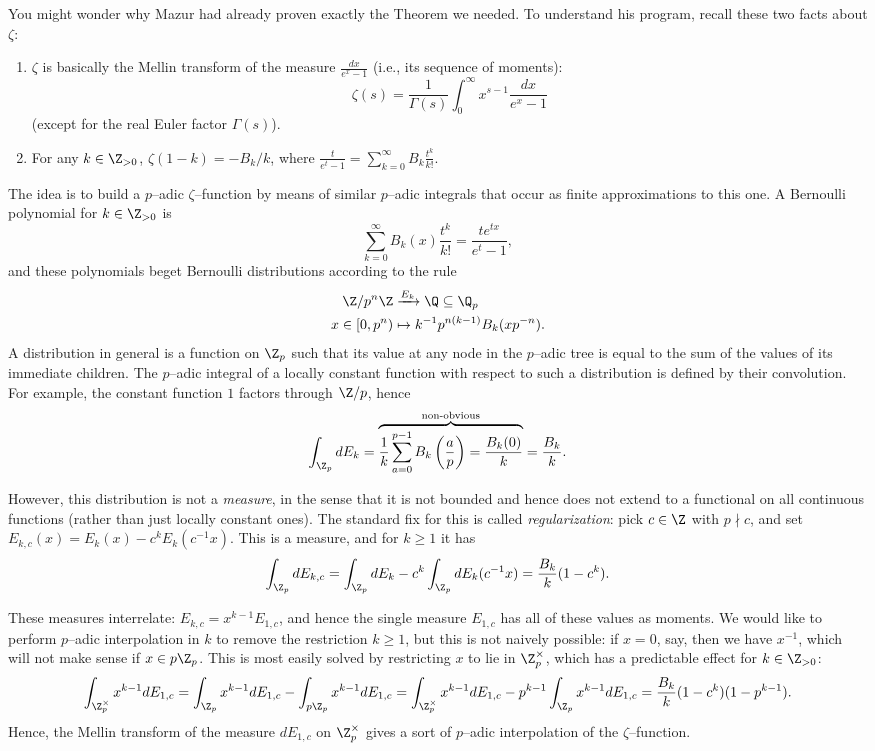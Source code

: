 You might wonder why Mazur had already proven exactly the Theorem we needed.  To understand his program, recall these two facts about $\zeta$:
\begin{enumerate}
    \item $\zeta$ is basically the Mellin transform of the measure $\frac{dx}{e^x - 1}$ (i.e., its sequence of moments): \[\zeta(s) = \frac{1}{\Gamma(s)} \int_0^\infty x^{s-1} \frac{dx}{e^x - 1}\] (except for the real Euler factor $\Gamma(s)$).
    \item For any $k \in \Z_{> 0}$, $\zeta(1 - k) = -B_k / k$, where $\frac{t}{e^t - 1} = \sum_{k=0}^\infty B_k \frac{t^k}{k!}$.
\end{enumerate}
The idea is to build a $p$--adic $\zeta$--function by means of similar $p$--adic integrals that occur as finite approximations to this one.  A Bernoulli polynomial for $k \in \Z_{>0}$ is \[\sum_{k=0}^\infty B_k(x) \frac{t^k}{k!} = \frac{t e^{tx}}{e^t - 1},\] and these polynomials beget Bernoulli distributions according to the rule
\begin{align*}
\Z/p^n\Z & \xrightarrow{E_k} \Q \subseteq \Q_p \\
x \in [0, p^n) & \mapsto k^{-1} p^{n(k-1)} B_k(x p^{-n}).
\end{align*}
A distribution in general is a function on $\Z_p$ such that its value at any node in the $p$--adic tree is equal to the sum of the values of its immediate children.  The $p$--adic integral of a locally constant function with respect to such a distribution is defined by their convolution.  For example, the constant function $1$ factors through $\Z/p$, hence \[\int_{\Z_p} dE_k = \overset{\text{non-obvious}}{\overbrace{\frac{1}{k} \sum_{a=0}^{p-1} B_k\left(\frac{a}{p}\right) = \frac{B_k(0)}{k}}} = \frac{B_k}{k}.\]

However, this distribution is not a \emph{measure}, in the sense that it is not bounded and hence does not extend to a functional on all continuous functions (rather than just locally constant ones).  The standard fix for this is called \emph{regularization}: pick $c \in \Z$ with $p \nmid c$, and set $E_{k,c}(x) = E_k(x) - c^kE_k(c^{-1}x)$.  This is a measure, and for $k \ge 1$ it has \[\int_{\Z_p} dE_{k,c} = \int_{\Z_p} dE_k - c^k \int_{\Z_p} dE_k(c^{-1}x) = \frac{B_k}{k}(1 - c^k).\]

These measures interrelate: $E_{k, c} = x^{k-1} E_{1, c}$, and hence the single measure $E_{1, c}$ has all of these values as moments.  We would like to perform $p$--adic interpolation in $k$ to remove the restriction $k \ge 1$, but this is not naively possible: if $x = 0$, say, then we have $x^{-1}$, which will not make sense if $x \in p\Z_p$.  This is most easily solved by restricting $x$ to lie in $\Z_p^\times$, which has a predictable effect for $k \in \Z_{> 0}$: \[\int_{\Z_p^\times} x^{k-1} dE_{1,c} = \int_{\Z_p} x^{k-1} dE_{1,c} - \int_{p\Z_p} x^{k-1} dE_{1, c} = \int_{\Z_p^\times} x^{k-1} dE_{1,c} - p^{k-1} \int_{\Z_p} x^{k-1} dE_{1, c} = \frac{B_k}{k}(1 - c^k)(1 - p^{k-1}).\]  Hence, the Mellin transform of the measure $dE_{1,c}$ on $\Z_p^\times$ gives a sort of $p$--adic interpolation of the $\zeta$--function.

